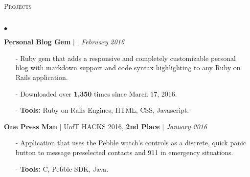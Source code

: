 \documentclass[11pt]{article}
\newcommand{\lineunder}{\vspace*{-8pt} \\ \hspace*{-18pt} \hrulefill \\}
\newcommand{\header}[1]{{\hspace*{-15pt}\vspace*{6pt} \textsc{#1}} \vspace*{-6pt} \lineunder }
\newenvironment{achievements}{\begin{list}{$\bullet$}{\topsep 0pt \itemsep -1.5pt \leftmargin 5pt}}{\vspace*{4pt}\end{list}}
\begin{document}
\header{\fontsize{11.1}{10}\selectfont Projects}
\begin{achievements}
\def\UrlFont{\em}
\item \textbf{Personal Blog Gem}  $|$  \href{https://github.com/nakulpathak3/personal-blog-gem}{\faGithub}  $|$ \href{https://rubygems.org/gems/personal_blog}{\faExternalLink} \hfill \textit {February 2016}
\begin{itemize}
\item[-]Ruby gem that adds a responsive and completely customizable personal blog with markdown support and code syntax highlighting to any Ruby on Rails application.
\vspace{2pt}
\item[-]Downloaded over \textbf{1,350} times since March 17, 2016.
\vspace{2pt}
\item[-]\textbf{Tools:} Ruby on Rails Engines, HTML, CSS, Javascript.
\end{itemize}

\vspace{5pt}

\item \textbf{One Press Man} {$|$ \scriptsize UofT HACKS 2016, \textbf{2nd Place}} $|$  \href{https://github.com/adrianmachado/Onepressman}{\faGithub} \hfill \textit {January 2016}
\begin{itemize}
\item[-]Application that uses the Pebble watch's controls as a discrete, quick panic button to message preselected contacts and 911 in emergency situations.
\vspace{2pt}
\item[-]\textbf{Tools:} C, Pebble SDK, Java.
\end{itemize}




\end{achievements}
\end{document}
